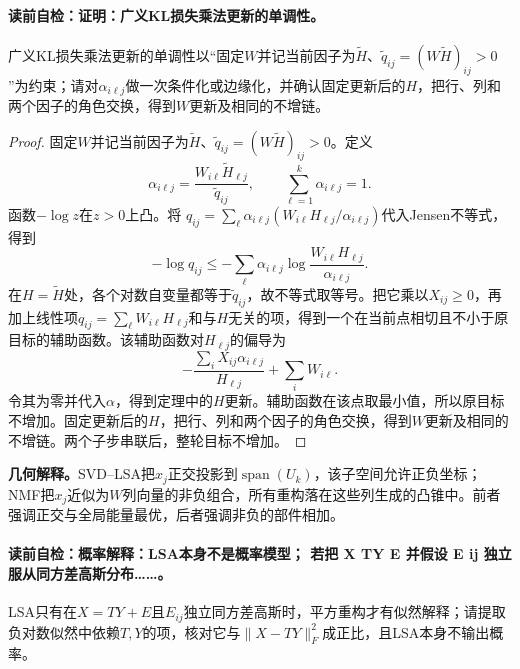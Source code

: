 \paragraph{读前自检：证明：广义KL损失乘法更新的单调性。}广义KL损失乘法更新的单调性以“固定$W$并记当前因子为$\widetilde H$、$\widetilde q_{ij}=(W\widetilde H)_{ij}>0$”为约束；请对$\alpha_{i\ell j}$做一次条件化或边缘化，并确认固定更新后的$H$，把行、列和两个因子的角色交换，得到$W$更新及相同的不增链。\par

\begin{proof}
固定$W$并记当前因子为$\widetilde H$、$\widetilde q_{ij}=(W\widetilde H)_{ij}>0$。定义
\[
\alpha_{i\ell j}=
\frac{W_{i\ell}\widetilde H_{\ell j}}{\widetilde q_{ij}},
\qquad
\sum_{\ell=1}^k\alpha_{i\ell j}=1.
\]
函数$-\log z$在$z>0$上凸。将
$q_{ij}=\sum_\ell\alpha_{i\ell j}
(W_{i\ell}H_{\ell j}/\alpha_{i\ell j})$代入Jensen不等式，得到
\[
-\log q_{ij}\le
-\sum_\ell\alpha_{i\ell j}
\log\frac{W_{i\ell}H_{\ell j}}{\alpha_{i\ell j}}.
\]
在$H=\widetilde H$处，各个对数自变量都等于$\widetilde q_{ij}$，故不等式取等号。把它乘以$X_{ij}\ge0$，再加上线性项$q_{ij}=\sum_\ell W_{i\ell}H_{\ell j}$和与$H$无关的项，得到一个在当前点相切且不小于原目标的辅助函数。该辅助函数对$H_{\ell j}$的偏导为
\[
-\frac{\sum_iX_{ij}\alpha_{i\ell j}}{H_{\ell j}}
+\sum_iW_{i\ell}.
\]
令其为零并代入$\alpha$，得到定理中的$H$更新。辅助函数在该点取最小值，所以原目标不增加。固定更新后的$H$，把行、列和两个因子的角色交换，得到$W$更新及相同的不增链。两个子步串联后，整轮目标不增加。
\end{proof}

\label{struct:V4-C05-CH14}
\begin{geometrybox}
\textbf{几何解释。}SVD--LSA把$x_j$正交投影到$\operatorname{span}(U_k)$，该子空间允许正负坐标；NMF把$x_j$近似为$W$列向量的非负组合，所有重构落在这些列生成的凸锥中。前者强调正交与全局能量最优，后者强调非负的部件相加。
\end{geometrybox}

\label{struct:V4-C05-CH15}
\paragraph{读前自检：概率解释：LSA本身不是概率模型； 若把 X TY E 并假设 E ij 独立服从同方差高斯分布……。}LSA只有在$X=TY+E$且$E_{ij}$独立同方差高斯时，平方重构才有似然解释；请提取负对数似然中依赖$T,Y$的项，核对它与$\lVert X-TY\rVert_F^2$成正比，且LSA本身不输出概率。\par

